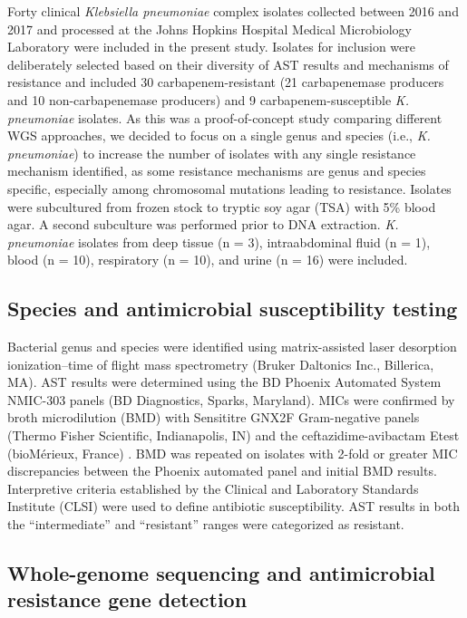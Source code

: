 Forty clinical \textit{Klebsiella pneumoniae} complex isolates collected between 2016 and 2017 and processed at the Johns Hopkins Hospital Medical Microbiology Laboratory were included in the present study. Isolates for inclusion were deliberately selected based on their diversity of AST results and mechanisms of resistance and included 30 carbapenem-resistant (21 carbapenemase producers and 10 non-carbapenemase producers) and 9 carbapenem-susceptible \textit{K. pneumoniae} isolates. As this was a proof-of-concept study comparing different WGS approaches, we decided to focus on a single genus and species (i.e., \textit{K. pneumoniae}) to increase the number of isolates with any single resistance mechanism identified, as some resistance mechanisms are genus and species specific, especially among chromosomal mutations leading to resistance. Isolates were subcultured from frozen stock to tryptic soy agar (TSA) with 5\% blood agar. A second subculture was performed prior to DNA extraction. \textit{K. pneumoniae} isolates from deep tissue (n = 3), intraabdominal fluid (n = 1), blood (n = 10), respiratory (n = 10), and urine (n = 16) were included.

\subsection{Species and antimicrobial susceptibility testing}
\label{sec:ast}

Bacterial genus and species were identified using matrix-assisted laser desorption ionization–time of flight mass spectrometry (Bruker Daltonics Inc., Billerica, MA). AST results were determined using the BD Phoenix Automated System NMIC-303 panels (BD Diagnostics, Sparks, Maryland). MICs were confirmed by broth microdilution (BMD) with Sensititre GNX2F Gram-negative panels (Thermo Fisher Scientific, Indianapolis, IN) and the ceftazidime-avibactam Etest (bioMérieux, France) \citep{Matuschek2018-qh}. BMD was repeated on isolates with 2-fold or greater MIC discrepancies between the Phoenix automated panel and initial BMD results. Interpretive criteria established by the Clinical and Laboratory Standards Institute (CLSI) were used to define antibiotic susceptibility. AST results in both the “intermediate” and “resistant” ranges were categorized as resistant.

\subsection{Whole-genome sequencing and antimicrobial resistance gene detection}
\label{sec:wgs}

